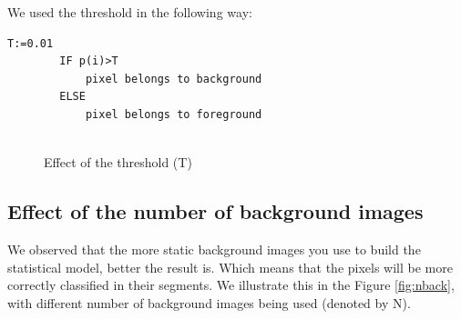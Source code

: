 \documentclass{article}
\begin{document}
	We used the threshold in the following way:

	\begin{lstlisting}[frame=single]
		T:=0.01
		IF p(i)>T
			pixel belongs to background
		ELSE
			pixel belongs to foreground
		
	\end{lstlisting}

	\begin{figure}[H]
		  \centering
		  \caption{Effect of the threshold (T)}
		  \label{fig:threshold}
	\end{figure}

\subsection{Effect of the number of background images}

	We observed that the more static background images you use to build the statistical model, better the result is. Which means that the pixels will be more correctly classified in their segments. We illustrate this in the Figure \ref{fig:nback}, with different number of background images being used (denoted by N). 
	
\end{document}
